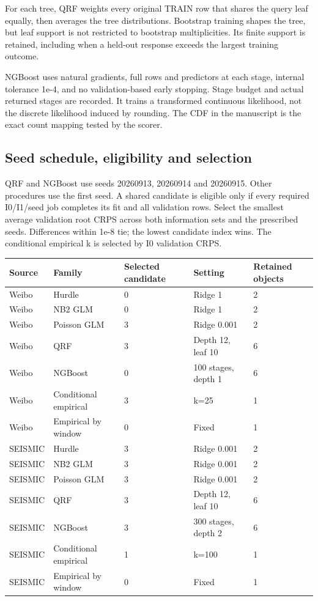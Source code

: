 For each tree, QRF weights every original TRAIN row that shares the query leaf equally, then averages the tree distributions. Bootstrap training shapes the tree, but leaf support is not restricted to bootstrap multiplicities. Its finite support is retained, including when a held-out response exceeds the largest training outcome.

NGBoost uses natural gradients, full rows and predictors at each stage, internal tolerance 1e-4, and no validation-based early stopping. Stage budget and actual returned stages are recorded. It trains a transformed continuous likelihood, not the discrete likelihood induced by rounding. The CDF in the manuscript is the exact count mapping tested by the scorer.

\hypertarget{s2.2-seed-schedule-eligibility-and-selection}{%
\subsection{Seed schedule, eligibility and selection}\label{s2.2-seed-schedule-eligibility-and-selection}}

QRF and NGBoost use seeds 20260913, 20260914 and 20260915. Other procedures use the first seed. A shared candidate is eligible only if every required I0/I1/seed job completes its fit and all validation rows. Select the smallest average validation root CRPS across both information sets and the prescribed seeds. Differences within 1e-8 tie; the lowest candidate index wins. The conditional empirical k is selected by I0 validation CRPS.

\small\begin{longtable}[]{@{}lllll@{}}
\toprule\noalign{}
Source & Family & Selected candidate & Setting & Retained objects \\
\midrule\noalign{}
\endhead
\bottomrule\noalign{}
\endlastfoot
Weibo & Hurdle & 0 & Ridge 1 & 2 \\
Weibo & NB2 GLM & 0 & Ridge 1 & 2 \\
Weibo & Poisson GLM & 3 & Ridge 0.001 & 2 \\
Weibo & QRF & 3 & Depth 12, leaf 10 & 6 \\
Weibo & NGBoost & 0 & 100 stages, depth 1 & 6 \\
Weibo & Conditional empirical & 3 & k=25 & 1 \\
Weibo & Empirical by window & 0 & Fixed & 1 \\
SEISMIC & Hurdle & 3 & Ridge 0.001 & 2 \\
SEISMIC & NB2 GLM & 3 & Ridge 0.001 & 2 \\
SEISMIC & Poisson GLM & 3 & Ridge 0.001 & 2 \\
SEISMIC & QRF & 3 & Depth 12, leaf 10 & 6 \\
SEISMIC & NGBoost & 3 & 300 stages, depth 2 & 6 \\
SEISMIC & Conditional empirical & 1 & k=100 & 1 \\
SEISMIC & Empirical by window & 0 & Fixed & 1 \\
\end{longtable}\normalsize

